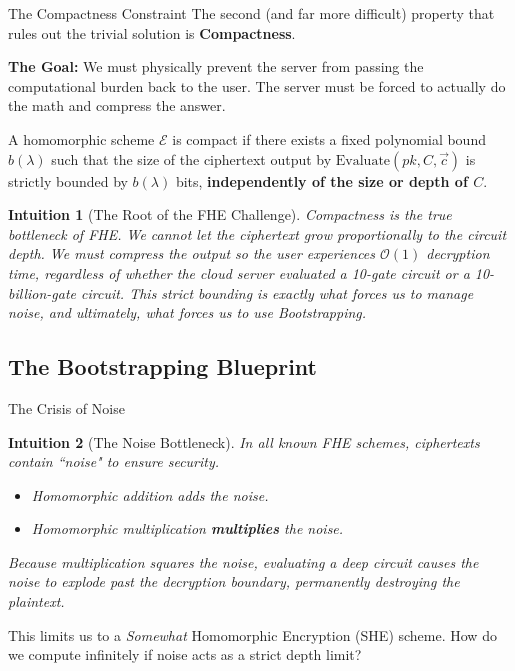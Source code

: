 \documentclass[10pt,handout]{beamer}
\newtheorem{intuition}{Intuition}
\begin{document}
\begin{frame}{The Compactness Constraint}
    The second (and far more difficult) property that rules out the trivial solution is \textbf{Compactness}.
    \pause
    
    \vspace{0.3cm}
    \textbf{The Goal:} We must physically prevent the server from passing the computational burden back to the user. The server must be forced to actually do the math and compress the answer.
    \pause

    \begin{definition}[Compactness]
    A homomorphic scheme $\mathcal{E}$ is compact if there exists a fixed polynomial bound $b(\lambda)$ such that the size of the ciphertext output by $\text{Evaluate}(pk, C, \vec{c})$ is strictly bounded by $b(\lambda)$ bits, \textbf{independently of the size or depth of $C$}.
    \end{definition}
    \pause

    \begin{intuition}[The Root of the FHE Challenge]
    Compactness is the true bottleneck of FHE. We cannot let the ciphertext grow proportionally to the circuit depth. We must compress the output so the user experiences $\mathcal{O}(1)$ decryption time, regardless of whether the cloud server evaluated a 10-gate circuit or a 10-billion-gate circuit. This strict bounding is exactly what forces us to manage noise, and ultimately, what forces us to use Bootstrapping.
    \end{intuition}
\end{frame}

\subsection{The Bootstrapping Blueprint}

\begin{frame}{The Crisis of Noise}
    \begin{intuition}[The Noise Bottleneck]
    In all known FHE schemes, ciphertexts contain ``noise" to ensure security. 
    \begin{itemize}
        \item Homomorphic addition adds the noise.
        \item Homomorphic multiplication \textbf{multiplies} the noise.
    \end{itemize}
    Because multiplication squares the noise, evaluating a deep circuit causes the noise to explode past the decryption boundary, permanently destroying the plaintext.
    \end{intuition}
    \pause
    
    \vspace{0.3cm}
    This limits us to a \textit{Somewhat} Homomorphic Encryption (SHE) scheme. How do we compute infinitely if noise acts as a strict depth limit?
\end{frame}
\end{document}
